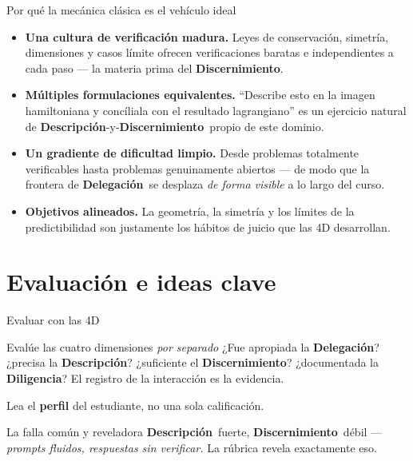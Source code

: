 \documentclass[aspectratio=169,11pt]{beamer}
\newcommand{\Del}{\textcolor{Cdel}{\textbf{Delegación}}}
\newcommand{\Des}{\textcolor{Cdes}{\textbf{Descripción}}}
\newcommand{\Dis}{\textcolor{Cdis}{\textbf{Discernimiento}}}
\newcommand{\Dil}{\textcolor{Cdil}{\textbf{Diligencia}}}
\begin{document}
\begin{frame}{Por qué la mecánica clásica es el vehículo ideal}
  \begin{itemize}\setlength\itemsep{0.55em}
    \item \textbf{Una cultura de verificación madura.} Leyes de conservación, simetría,
          dimensiones y casos límite ofrecen verificaciones baratas e independientes a
          cada paso --- la materia prima del \Dis.
    \item \textbf{Múltiples formulaciones equivalentes.} ``Describe esto en la imagen
          hamiltoniana y concíliala con el resultado lagrangiano'' es un ejercicio natural
          de \Des-y-\Dis\ propio de este dominio.
    \item \textbf{Un gradiente de dificultad limpio.} Desde problemas totalmente
          verificables hasta problemas genuinamente abiertos --- de modo que la frontera
          de \Del\ se desplaza \emph{de forma visible} a lo largo del curso.
    \item \textbf{Objetivos alineados.} La geometría, la simetría y los límites de la
          predictibilidad son justamente los hábitos de juicio que las 4D desarrollan.
  \end{itemize}
\end{frame}

\section{Evaluación e ideas clave}

\begin{frame}{Evaluar con las 4D}
  \begin{block}{Evalúe las cuatro dimensiones \emph{por separado}}
    ¿Fue apropiada la \Del? ¿precisa la \Des? ¿suficiente el \Dis?
    ¿documentada la \Dil? \; El registro de la interacción es la evidencia.
  \end{block}
  \vspace{0.4em}
  Lea el \textbf{perfil} del estudiante, no una sola calificación.
  \vspace{0.6em}
  \begin{alertblock}{La falla común y reveladora}
    \Des\ fuerte, \Dis\ débil --- \emph{prompts fluidos, respuestas sin verificar.}
    La rúbrica revela exactamente eso.
  \end{alertblock}
\end{frame}
\end{document}
